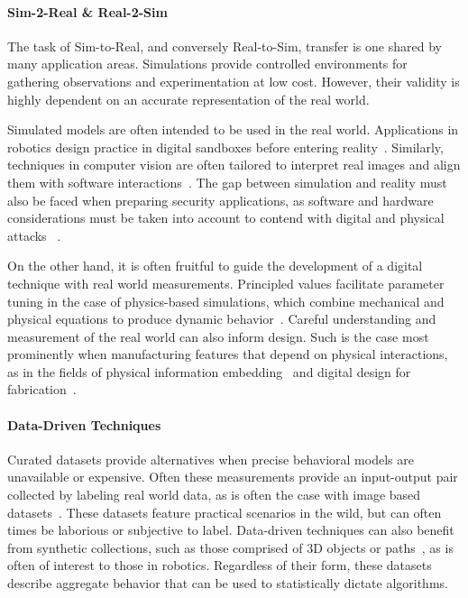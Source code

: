 \documentclass[12pt]{report}
\begin{document}
\paragraph{Sim-2-Real \& Real-2-Sim}\label{sec:rel_real2sim}

The task of Sim-to-Real, and conversely Real-to-Sim, 
transfer is one shared by many application areas.
Simulations provide controlled environments for 
gathering observations and experimentation at low cost.
However, their validity is highly dependent 
on an accurate representation of the real world.

Simulated models are often intended to be used in the real world.
Applications in robotics design practice in digital sandboxes before entering 
reality~\cite{kappler2015leveraging,romano2011human,varley2017shapecompletion_iros}.
Similarly, techniques in computer vision are often tailored to 
interpret real images and align them with software
interactions~\cite{Epstein_2020_CVPR,jo2016shutter,CAVE_0352}.
The gap between simulation and reality must also be faced when preparing security applications,
as software and hardware considerations must be taken into account to contend with
digital and physical attacks ~\cite{batina2019csi,hu2020deepsniffer,maia2021hear}.

On the other hand, it is often fruitful to guide the development 
of a digital technique with real world measurements. 
Principled values facilitate parameter tuning in the case of physics-based simulations,
which combine mechanical and physical equations to produce dynamic 
behavior~\cite{chen2021boombox,Fei2017wetHair,adonis14}.
Careful understanding and measurement of the real world can also inform design.
Such is the case most prominently when manufacturing features that depend on physical interactions,
as in the fields of physical information embedding~\cite{ding2017air,Li:2016:acoustic_voxels,Maia:2019}
and digital design for fabrication~\cite{Schulz2017cad,Schulz2017robogami,shulz2018trade}.

\vspace{-2mm}
\paragraph{Data-Driven Techniques}\label{sec:rel_data}
Curated datasets provide alternatives when precise behavioral models are unavailable or expensive.
Often these measurements provide an input-output pair collected by labeling real world data,
as is often the case with image based datasets~\cite{deng2009imagenet,deng2012mnist}.
These datasets feature practical scenarios in the wild, 
but can often times be laborious or subjective to label.
Data-driven techniques can also benefit from synthetic collections,
such as those comprised of 3D objects or paths~\cite{calli2015ycb,goldfeder2009columbia,Thingi10K},
as is often of interest to those in robotics. 
Regardless of their form, these datasets describe aggregate behavior that
can be used to statistically dictate algorithms.
\end{document}
